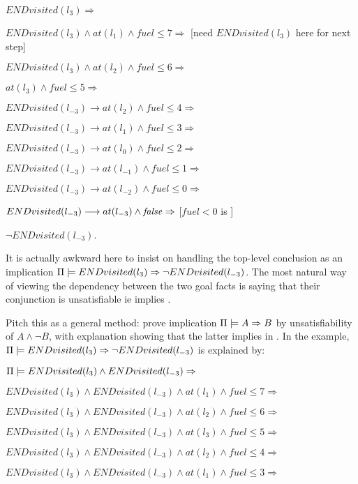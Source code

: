 $END visited(l_{3}) \Rightarrow$ 

$END visited(l_{3}) \wedge at(l_{1}) \wedge fuel \leq 7 \Rightarrow$
[need $END visited(l_{3})$ here for next step]

$END visited(l_{3}) \wedge at(l_{2}) \wedge fuel \leq 6 \Rightarrow$

$at(l_{3}) \wedge fuel \leq 5 \Rightarrow$ 

$END visited(l_{-3}) \longrightarrow at(l_{2}) \wedge fuel \leq 4
\Rightarrow$ 

$END visited(l_{-3}) \longrightarrow at(l_{1}) \wedge fuel \leq 3
\Rightarrow$ 

$END visited(l_{-3}) \longrightarrow at(l_{0}) \wedge
fuel \leq 2 \Rightarrow$ 

$END visited(l_{-3}) \longrightarrow at(l_{-1}) \wedge fuel \leq 1
\Rightarrow$

$END visited(l_{-3}) \longrightarrow at(l_{-2}) \wedge fuel \leq 0
\Rightarrow$

$END visited(l_{-3}) \longrightarrow at(l_{-3}) \wedge \mathit{false}
\Rightarrow$ [$fuel < 0$ is \false]

$\neg END visited(l_{-3})$.

It is actually awkward here to insist on handling the top-level
conclusion as an implication $\Pi \models END visited(l_3) \Rightarrow \neg
  END visited(l_{-3})$. The most natural way of viewing the
dependency between the two goal facts is saying that their conjunction
is unsatisfiable ie implies \false.

Pitch this as a general method: prove implication
$\Pi \models A \Rightarrow B$ by unsatisfiability of $A \wedge \neg B$,
with explanation showing that the latter implies \false in \plans. In
the example, $\Pi \models END visited(l_{3}) \Rightarrow \neg END
  visited(l_{-3})$ is explained by:

$\Pi \models END visited(l_{3}) \wedge END visited(l_{-3}) \Rightarrow$ 

$END visited(l_{3}) \wedge END visited(l_{-3}) \wedge at(l_{1})
\wedge fuel \leq 7 \Rightarrow$

$END visited(l_{3}) \wedge END visited(l_{-3}) \wedge at(l_{2})
\wedge fuel \leq 6 \Rightarrow$

$END visited(l_{3}) \wedge END visited(l_{-3}) \wedge at(l_{3})
\wedge fuel \leq 5 \Rightarrow$

$END visited(l_{3}) \wedge END visited(l_{-3}) \wedge at(l_{2})
\wedge fuel \leq 4 \Rightarrow$

$END visited(l_{3}) \wedge END visited(l_{-3}) \wedge at(l_{1})
\wedge fuel \leq 3 \Rightarrow$

